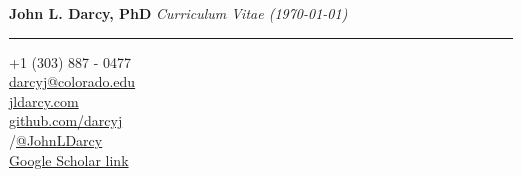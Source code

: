 \documentclass{article}
\begin{document}
{\Huge \textbf{John L. Darcy, PhD}}
\hfill
\emph{Curriculum Vitae (\today)}
\vspace{1mm}
\hrule
\vspace{2mm}

\begin{adjustwidth}{5mm}{}
  \begin{multicols}{3}
    \faPhone \space +1 (303) 887 - 0477\\
    \faEnvelope \space \href{mailto:darcyj@colorado.edu}{darcyj@colorado.edu}\\
    \faGlobe \space \href{http://www.jldarcy.tk/}{jldarcy.com}\\
    \faGithub \space \href{https://github.com/darcyj}{github.com/darcyj}\\
    \faInstagram/\faTwitter \space \href{https://www.instagram.com/jld.adventures/}{@JohnLDarcy}\\
    \faMortarBoard \space \href{https://scholar.google.com/citations?user=z24F3PYAAAAJ}{Google Scholar link}
  \end{multicols}
\end{adjustwidth}
\end{document}
